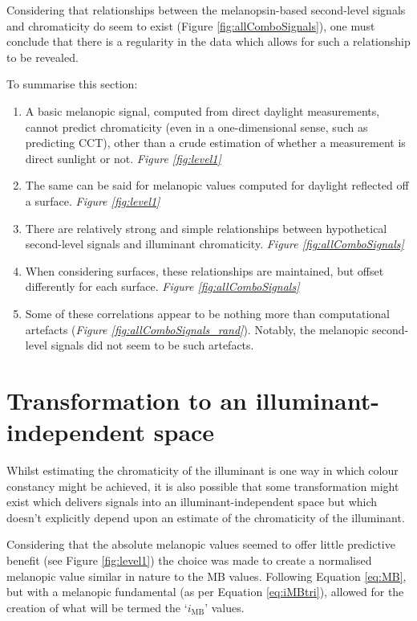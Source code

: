 Considering that relationships between the melanopsin-based second-level signals and chromaticity do seem to exist (Figure \ref{fig:allComboSignals}), one must conclude that there is a regularity in the data which allows for such a relationship to be revealed.

\bigskip
\noindent
To summarise this section:

\begin{enumerate}
   \item A basic melanopic signal, computed from direct daylight measurements, cannot predict chromaticity (even in a one-dimensional sense, such as predicting \gls{CCT}), other than a crude estimation of whether a measurement is direct sunlight or not. \emph{Figure \ref{fig:level1}}
    \item The same can be said for melanopic values computed for daylight reflected off a surface. \emph{Figure \ref{fig:level1}}
    \item There are relatively strong and simple relationships between hypothetical second-level signals and illuminant chromaticity. \emph{Figure \ref{fig:allComboSignals}}
    \item When considering surfaces, these relationships are maintained, but offset differently for each surface. \emph{Figure \ref{fig:allComboSignals}}
    \item Some of these correlations appear to be nothing more than computational artefacts (\emph{Figure \ref{fig:allComboSignals_rand}}). Notably, the melanopic second-level signals did not seem to be such artefacts.
\end{enumerate}

\section{Transformation to an illuminant-independent space}

Whilst estimating the chromaticity of the illuminant is one way in which colour constancy might be achieved, it is also possible that some transformation might exist which delivers signals into an illuminant-independent space but which doesn't explicitly depend upon an estimate of the chromaticity of the illuminant.

Considering that the absolute melanopic values seemed to offer little predictive benefit (see Figure \ref{fig:level1}) the choice was made to create a normalised melanopic value similar in nature to the MB values. Following Equation \ref{eq:MB}, but with a melanopic fundamental (as per Equation \ref{eq:iMBtri}), allowed for the creation of what will be termed the `$i_{\text{MB}}$' values.

